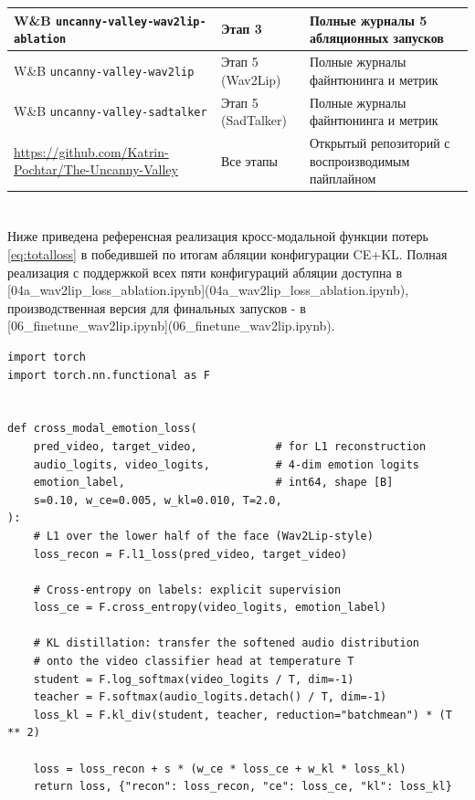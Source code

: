 \documentclass[a4paper, 12pt, oneside, openany]{article}
\begin{document}
\begin{table}[H]
\begin{tabular}{|p{4.7cm}|p{3.5cm}|p{6.5cm}|}
\hline
W\&B \texttt{uncanny-valley-wav2lip-ablation} & Этап 3 & Полные журналы 5 абляционных запусков \\
\hline
W\&B \texttt{uncanny-valley-wav2lip} & Этап 5 (Wav2Lip) & Полные журналы файнтюнинга и метрик \\
\hline
W\&B \texttt{uncanny-valley-sadtalker} & Этап 5 (SadTalker) & Полные журналы файнтюнинга и метрик \\
\hline
\url{https://github.com/Katrin-Pochtar/The-Uncanny-Valley} & Все этапы & Открытый репозиторий с воспроизводимым пайплайном \\
\hline
\end{tabular}
\end{table}


\newpage
\section{\centering}\label{PrilB}
\begin{center}
\end{center}
\setcounter{equation}{0}
\renewcommand{\theequation}{\Asbuk{section}.\arabic{equation}}
\setcounter{table}{0}
\renewcommand{\thetable}{\Asbuk{section}.\arabic{table}}
\setcounter{figure}{0}
\renewcommand{\thefigure}{\Asbuk{section}.\arabic{figure}}

Ниже приведена референсная реализация кросс-модальной функции потерь \eqref{eq:totalloss} в победившей по итогам абляции конфигурации CE+KL. Полная реализация с поддержкой всех пяти конфигураций абляции доступна в [04a\_wav2lip\_loss\_ablation.ipynb](04a\_wav2lip\_loss\_ablation.ipynb), производственная версия для финальных запусков - в [06\_finetune\_wav2lip.ipynb](06\_finetune\_wav2lip.ipynb).

\begin{lstlisting}[label=lst:loss, caption=Кросс-модальная функция потерь (CE+KL)]
import torch
import torch.nn.functional as F


def cross_modal_emotion_loss(
    pred_video, target_video,            # for L1 reconstruction
    audio_logits, video_logits,          # 4-dim emotion logits
    emotion_label,                       # int64, shape [B]
    s=0.10, w_ce=0.005, w_kl=0.010, T=2.0,
):
    # L1 over the lower half of the face (Wav2Lip-style)
    loss_recon = F.l1_loss(pred_video, target_video)

    # Cross-entropy on labels: explicit supervision
    loss_ce = F.cross_entropy(video_logits, emotion_label)

    # KL distillation: transfer the softened audio distribution
    # onto the video classifier head at temperature T
    student = F.log_softmax(video_logits / T, dim=-1)
    teacher = F.softmax(audio_logits.detach() / T, dim=-1)
    loss_kl = F.kl_div(student, teacher, reduction="batchmean") * (T ** 2)

    loss = loss_recon + s * (w_ce * loss_ce + w_kl * loss_kl)
    return loss, {"recon": loss_recon, "ce": loss_ce, "kl": loss_kl}
\end{lstlisting}
\end{document}

